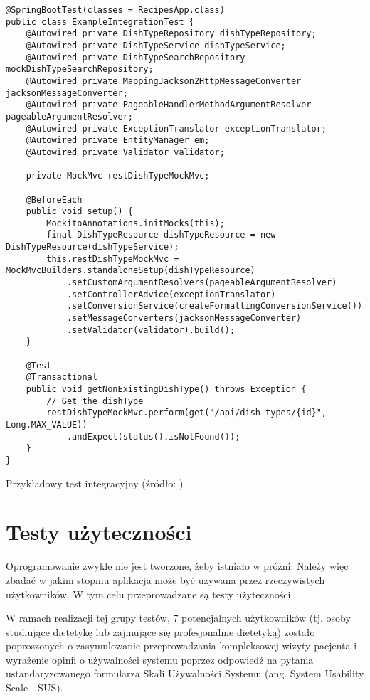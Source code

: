 \begin{listing}[h!]
\begin{verbatim}
@SpringBootTest(classes = RecipesApp.class)
public class ExampleIntegrationTest {
    @Autowired private DishTypeRepository dishTypeRepository;
    @Autowired private DishTypeService dishTypeService;
    @Autowired private DishTypeSearchRepository mockDishTypeSearchRepository;
    @Autowired private MappingJackson2HttpMessageConverter jacksonMessageConverter;
    @Autowired private PageableHandlerMethodArgumentResolver pageableArgumentResolver;
    @Autowired private ExceptionTranslator exceptionTranslator;
    @Autowired private EntityManager em;
    @Autowired private Validator validator;

    private MockMvc restDishTypeMockMvc;

    @BeforeEach
    public void setup() {
        MockitoAnnotations.initMocks(this);
        final DishTypeResource dishTypeResource = new DishTypeResource(dishTypeService);
        this.restDishTypeMockMvc = MockMvcBuilders.standaloneSetup(dishTypeResource)
            .setCustomArgumentResolvers(pageableArgumentResolver)
            .setControllerAdvice(exceptionTranslator)
            .setConversionService(createFormattingConversionService())
            .setMessageConverters(jacksonMessageConverter)
            .setValidator(validator).build();
    }

    @Test
    @Transactional
    public void getNonExistingDishType() throws Exception {
        // Get the dishType
        restDishTypeMockMvc.perform(get("/api/dish-types/{id}", Long.MAX_VALUE))
            .andExpect(status().isNotFound());
    }
}
\end{verbatim}
    \centering\caption{Przykładowy test integracyjny (źródło: \ownwork)}\label{listing:integration-test}
\end{listing}

\newpage %

\section{Testy użyteczności}

Oprogramowanie zwykle nie jest tworzone, żeby istniało w próżni.
Należy więc zbadać w jakim stopniu aplikacja może być używana przez rzeczywistych użytkowników.
W tym celu przeprowadzane są testy użyteczności\cite{book:testowanie-i-jakosc-oprogramowania}.

\par
W ramach realizacji tej grupy testów, 7 potencjalnych użytkowników (tj. osoby studiujące dietetykę lub zajmujące się profesjonalnie dietetyką)
zostało poproszonych o zasymulowanie przeprowadzania kompleksowej wizyty pacjenta
i wyrażenie opinii o używalności systemu poprzez odpowiedź na pytania ustandaryzowanego formularza Skali Używalności Systemu (ang. System Usability Scale - SUS)\cite{url:sus}.


